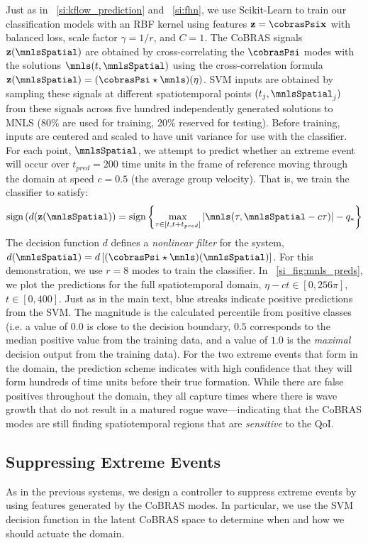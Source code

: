 \documentclass[twocolumn,10pt]{article}
\begin{document}
Just as in ~\ref{si:kflow_prediction} and ~\ref{si:fhn}, we use Scikit-Learn to train our classification models with an RBF kernel using features $\mathbf z = \cobrasPsi \mathbf x$ with balanced loss, scale factor $\gamma = 1/r$, and $C=1$. The CoBRAS signals $\mathbf z(\mnlsSpatial)$ are obtained by cross-correlating the $\cobrasPsi$ modes with the solutions $\mnls(t,\mnlsSpatial)$ using the cross-correlation formula $\mathbf z(\mnlsSpatial) = (\cobrasPsi \star \mnls)(\eta)$. SVM inputs are obtained by sampling these signals at different spatiotemporal points $(t_j, \mnlsSpatial_j)$ from these signals across five hundred independently generated solutions to MNLS (80\% are used for training, 20\% reserved for testing). Before training, inputs are centered and scaled to have unit variance for use with the classifier. For each point, $\mnlsSpatial$, we attempt to predict whether an extreme event will occur over $t_{pred}=200$ time units in the frame of reference moving through the domain at speed $c=0.5$ (the average group velocity). That is, we train the classifier to satisfy: 
$$
\text{sign} \left(   d(\mathbf z(\mnlsSpatial) \right)= \text{sign}\left\{\max_{\tau \in [t, t+t_{pred}]} |\mnls(\tau, \mnlsSpatial - c \tau)| -q_*   \right\}
$$
%
The decision function $d$ defines a \textit{nonlinear filter} for the system,
$d(\mnlsSpatial) = d\left[(\cobrasPsi \star \mnls)(\mnlsSpatial)\right]$. For this demonstration, we use $r=8$ modes to train the classifier. In \figurename ~\ref{si_fig:mnls_preds}, we plot the predictions for the full spatiotemporal domain, $\eta-ct \in [0,256\pi]$,  $t \in [0,400]$. Just as in the main text, blue streaks indicate positive predictions from the SVM. The magnitude is the calculated percentile from positive classes (i.e. a value of $0.0$ is close to the decision boundary, $0.5$ corresponds to the median positive value from the training data, and a value of $1.0$ is the \textit{maximal} decision output from the training data). For the two extreme events that form in the domain, the prediction scheme indicates with high confidence that they will form hundreds of time units before their true formation. While there are false positives throughout the domain, they all capture times where there is wave growth that do not result in a matured rogue wave---indicating that the CoBRAS modes are still finding spatiotemporal regions that are \textit{sensitive} to the QoI. 

\subsection{Suppressing Extreme Events}
\label{si:mnls_control}
As in the previous systems, we design a controller to suppress extreme events by using features generated by the CoBRAS modes. In particular, we use the SVM decision function in the latent CoBRAS space to determine when and how  we should actuate the domain. 
\end{document}
